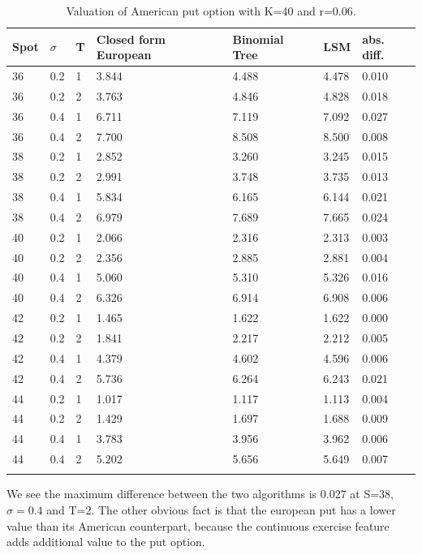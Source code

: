 \begin{table}[th]
\caption{Valuation of American put option with K=40 and r=0.06.}
\label{tab:treatments}
\centering
\begin{tabular}{l l l l l l l }
\toprule
\textbf{Spot} & \textbf{$\sigma$} & \textbf{T} & \textbf{Closed form European} & \textbf{Binomial Tree} & \textbf{LSM} & \textbf{abs. diff.} \\
\midrule
36 & 0.2 & 1 & 3.844 & 4.488 & 4.478 & 0.010\\
36 & 0.2 & 2 & 3.763 & 4.846 & 4.828 & 0.018\\
36 & 0.4 & 1 & 6.711 & 7.119 & 7.092 & 0.027\\
36 & 0.4 & 2 & 7.700 & 8.508 & 8.500 & 0.008\\
38 & 0.2 & 1 & 2.852 & 3.260 & 3.245 & 0.015\\
38 & 0.2 & 2 & 2.991 & 3.748 & 3.735 & 0.013\\
38 & 0.4 & 1 & 5.834 & 6.165 & 6.144 & 0.021\\
38 & 0.4 & 2 & 6.979 & 7.689 & 7.665 & 0.024\\
40 & 0.2 & 1 & 2.066 & 2.316 & 2.313 & 0.003\\
40 & 0.2 & 2 & 2.356 & 2.885 & 2.881 & 0.004\\
40 & 0.4 & 1 & 5.060 & 5.310 & 5.326 & 0.016\\
40 & 0.4 & 2 & 6.326 & 6.914 & 6.908 & 0.006\\
42 & 0.2 & 1 & 1.465 & 1.622 & 1.622 & 0.000\\
42 & 0.2 & 2 & 1.841 & 2.217 & 2.212 & 0.005\\
42 & 0.4 & 1 & 4.379 & 4.602 & 4.596 & 0.006\\
42 & 0.4 & 2 & 5.736 & 6.264 & 6.243 & 0.021\\
44 & 0.2 & 1 & 1.017 & 1.117 & 1.113 & 0.004\\
44 & 0.2 & 2 & 1.429 & 1.697 & 1.688 & 0.009\\
44 & 0.4 & 1 & 3.783 & 3.956 & 3.962 & 0.006\\
44 & 0.4 & 2 & 5.202 & 5.656 & 5.649 & 0.007\\
\bottomrule\\
\end{tabular}
\end{table}
We see the maximum difference between the two algorithms is 0.027 at S=38, $\sigma=0.4$ and T=2. The other obvious fact is that the european put has a lower value than its American counterpart, because the continuous exercise feature adds additional value to the put option. 
